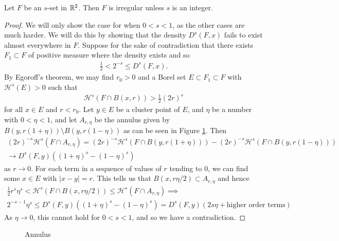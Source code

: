 \documentclass{memoir}
\begin{document}
\begin{thm}
	Let \(F\) be an \(s\)-set in \(\mathbb{R}^2\). Then \(F\) is irregular unless \(s\) is an integer.
\end{thm}
\begin{proof}
	We will only show the case for when \(0<s<1\), as the other cases are much harder. We will do this by showing that the density \(D^{s}(F,x)\) fails to exist almost everywhere in \(F\). Suppose for the sake of contradiction that there exists \(F_1\subset F\) of positive measure where the density exists and so
	\begin{align*}
		\frac{1}{2}< 2^{-s} \leq D^{s}(F,x).
	\end{align*}
	By Egoroff's theorem, we may find \(r_0>0\) and a Borel set \(E\subset F_1\subset F\) with \(\mathcal{H}^{s}(E) > 0\) such that
	\begin{align*}
		\mathcal{H}^{s}(F\cap B(x,r)) > \frac{1}{2}(2r)^{s}
	\end{align*}
	for all \(x \in E\) and \(r<r_0\). Let \(y \in E\) be a cluster point of \(E\), and \(\eta\) be a number with \(0<\eta <1\), and let \(A_{r,\eta }\) be the annulus given by \(B(y,r(1+\eta )) \setminus B(y,r(1-\eta ))\) as can be seen in Figure \ref{fig:annulus}. Then
	\begin{align*}
		(2r)^{-s}\mathcal{H}^{s}(F\cap A_{r,\eta }) = (2r)^{-s}\mathcal{H}^{s}(F\cap B(y,r(1+ \eta ))) - (2r)^{-s}\mathcal{H}^{s}(F\cap B(y,r(1-\eta )))\\
		\to D^{s}(F,y)((1+\eta )^{s}-(1-\eta )^{s})
	\end{align*} as \(r\to 0\). For each term in a sequence of values of \(r\) tending to 0, we can find some \(x \in E\) with \(\left| x-y \right| =r\). This tells us that \(B(x,r\eta  / 2) \subset A_{r,\eta }\) and hence
	\begin{align*}
		\frac{1}{2}r^{s}\eta^{s} < \mathcal{H}^{s}(F\cap B(x,r \eta  / 2)) \leq \mathcal{H}^{s}(F\cap A_{r,\eta }) \implies\\
		2^{-s-1}\eta^{s} \leq D^{s}(F,y)((1+\eta )^{s}-(1-\eta )^{s}) = D^{s}(F,y)(2s\eta +\text{higher order terms})
	\end{align*}
	As \(\eta \to 0\), this cannot hold for \(0<s<1\), and so we have a contradiction.
\end{proof}

\begin{figure}[ht]
    \caption{Annulus}
    \label{fig:annulus}
\end{figure}
\end{document}
